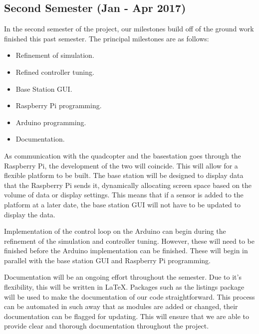 \subsection{Second Semester (Jan - Apr 2017)}
In the second semester of the project, our milestones build off of the ground work finished this past semester.  The principal milestones are as follows:
\begin{itemize}
	\item Refinement of simulation.
	\item Refined controller tuning.
	\item Base Station GUI.
	\item Raspberry Pi programming.
	\item Arduino programming.
	\item Documentation.
\end{itemize}
As communication with the quadcopter and the basestation goes through the Raspberry Pi, the development of the two will coincide.  This will allow for a flexible platform to be built.  The base station will be designed to display data that the Raspberry Pi sends it, dynamically allocating screen space based on the volume of data or display settings.  This means that if a sensor is added to the platform at a later date, the base station GUI will not have to be updated to display the data.

Implementation of the control loop on the Arduino can begin during the refinement of the simulation and controller tuning.  However, these will need to be finished before the Arduino implementation can be finished.  These will begin in parallel with the base station GUI and Raspberry Pi programming.

Documentation will be an ongoing effort throughout the semester.  Due to it's flexibility, this will be written in \LaTeX.  Packages such as the listings package will be used to make the documentation of our code straightforward.  This process can be automated in such away that as modules are added or changed, their documentation can be flagged for updating.  This will ensure that we are able to provide clear and thorough documentation throughout the project. 
